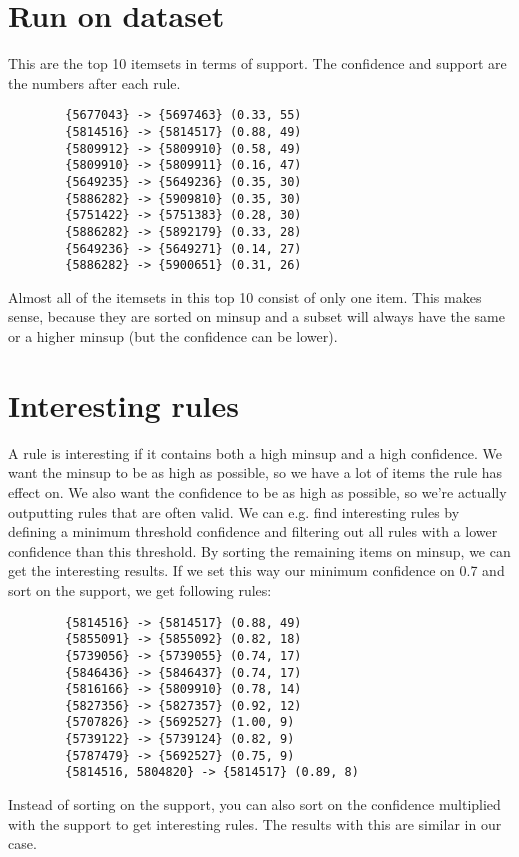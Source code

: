 \documentclass{article}
\begin{document}
    \section{Run on dataset}\label{sec:run-on-dataset}
    This are the top 10 itemsets in terms of support.
    The confidence and support are the numbers after each rule.
    \begin{verbatim}
        {5677043} -> {5697463} (0.33, 55)
        {5814516} -> {5814517} (0.88, 49)
        {5809912} -> {5809910} (0.58, 49)
        {5809910} -> {5809911} (0.16, 47)
        {5649235} -> {5649236} (0.35, 30)
        {5886282} -> {5909810} (0.35, 30)
        {5751422} -> {5751383} (0.28, 30)
        {5886282} -> {5892179} (0.33, 28)
        {5649236} -> {5649271} (0.14, 27)
        {5886282} -> {5900651} (0.31, 26)
    \end{verbatim}
    Almost all of the itemsets in this top 10 consist of only one item.
    This makes sense, because they are sorted on minsup and a subset will always have the same or a higher minsup (but the confidence can be lower).

    \section{Interesting rules}
    A rule is interesting if it contains both a high minsup and a high confidence.
    We want the minsup to be as high as possible, so we have a lot of items the rule has effect on.
    We also want the confidence to be as high as possible, so we're actually outputting rules that are often valid.
    We can e.g. find interesting rules by defining a minimum threshold confidence and filtering out all rules with a lower confidence than this threshold.
    By sorting the remaining items on minsup, we can get the interesting results.
    If we set this way our minimum confidence on 0.7 and sort on the support, we get following rules:
    \begin{verbatim}
        {5814516} -> {5814517} (0.88, 49)
        {5855091} -> {5855092} (0.82, 18)
        {5739056} -> {5739055} (0.74, 17)
        {5846436} -> {5846437} (0.74, 17)
        {5816166} -> {5809910} (0.78, 14)
        {5827356} -> {5827357} (0.92, 12)
        {5707826} -> {5692527} (1.00, 9)
        {5739122} -> {5739124} (0.82, 9)
        {5787479} -> {5692527} (0.75, 9)
        {5814516, 5804820} -> {5814517} (0.89, 8)
    \end{verbatim}
    Instead of sorting on the support, you can also sort on the confidence multiplied with the support to get interesting rules.
    The results with this are similar in our case.
\end{document}
